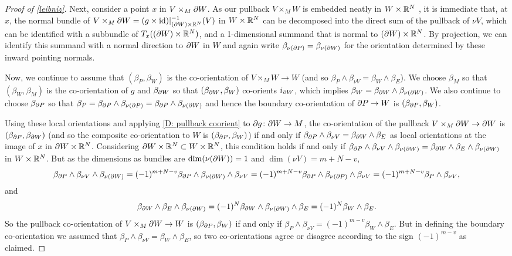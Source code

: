 \begin{proof}[Proof of \cref{leibniz}]
	Next, consider a point $x$ in $V \times_M \partial W$.
	As our pullback $V \times_M W$ is embedded neatly in $W \times \mathbb{R}^N$ \cite[Proposition IV.1.4]{Kos93}, it is immediate that, at $x$, the normal bundle of $V \times_M \partial W = (g \times \mathrm{id})|_{(\partial W) \times \mathbb{R}^N}^{-1}(V)$ in $W \times \mathbb{R}^N$ can be decomposed into the direct sum of the pullback of $\nu V$, which can be identified with a subbundle of $T_x((\partial W) \times \mathbb{R}^N)$, and a 1-dimensional summand that is normal to $(\partial W) \times \mathbb{R}^N$. By projection, we can identify this summand with a normal direction to $\partial W$ in $W$ and again write $\beta_{\nu(\partial P)}=\beta_{\nu(\partial W)}$ for the orientation determined by these inward pointing normals.


	Now, we continue to assume that $(\beta_P, \beta_W)$ is the co-orientation of $V \times_M W \to W$ (and so $\beta_P \wedge \beta_{\nu V} = \beta_W \wedge \beta_E$).
	We choose $\beta_M$ so that $(\beta_W,\beta_M)$ is the co-orientation of $g$ and $\beta_{\partial W}$ so that $(\beta_{\partial W},\beta_W)$ co-orients $i_{\partial W}$, which implies $\beta_W = \beta_{\partial W} \wedge \beta_{\nu(\partial W)}$.
	We also continue to choose $\beta_{\partial P}$ so that $\beta_P = \beta_{\partial P} \wedge \beta_{\nu(\partial P)} = \beta_{\partial P} \wedge \beta_{\nu(\partial W)}$ and hence the boundary co-orientation of $\partial P \to W$ is $(\beta_{\partial P}, \beta_W)$.

	Using these local orientations and applying \cref{D: pullback coorient} to $\partial g \colon \partial W \to M$, the co-orientation of the pullback $V \times_M \partial W \to \partial W$ is $(\beta_{\partial P},\beta_{\partial W})$ (and so the composite co-orientation to $W$ is $(\beta_{\partial P}, \beta_W)$) if and only if $\beta_{\partial P} \wedge \beta_{\nu V} = \beta_{\partial W} \wedge \beta_E$ as local orientations at the image of $x$ in $\partial W \times \mathbb{R}^N$.
	Considering $\partial W \times \mathbb{R}^N \subset W \times \mathbb{R}^N$, this condition holds if and only if $\beta_{\partial P} \wedge \beta_{\nu V} \wedge \beta_{\nu(\partial W)} = \beta_{\partial W} \wedge \beta_E \wedge \beta_{\nu(\partial W)}$ in $W \times \mathbb{R}^N$.
	But as the dimensions as bundles are $\dim(\nu(\partial W)) = 1$ and $\dim(\nu V) = m+N-v$,
	$$\beta_{\partial P} \wedge \beta_{\nu V} \wedge \beta_{\nu(\partial W)} = (-1)^{m+N-v}\beta_{\partial P} \wedge \beta_{\nu(\partial W)} \wedge \beta_{\nu V} = (-1)^{m+N-v}\beta_{\partial P} \wedge \beta_{\nu(\partial P)} \wedge \beta_{\nu V} = (-1)^{m+N-v}\beta_P \wedge \beta_{\nu V} ,$$
	and
	$$\beta_{\partial W} \wedge \beta_E \wedge \beta_{\nu(\partial W)} = (-1)^N\beta_{\partial W} \wedge \beta_{\nu(\partial W)} \wedge \beta_E = (-1)^N\beta_{W} \wedge \beta_E.$$
	So the pullback co-orientation of $V \times_M \partial W \to W$ is $(\beta_{\partial P},\beta_W)$ if and only if $\beta_P \wedge \beta_{\nu V} = (-1)^{m-v}\beta_{W} \wedge \beta_E$.
	But in defining the boundary co-orientation we assumed that $\beta_P \wedge \beta_{\nu V} = \beta_{W} \wedge \beta_E$, so two co-orientations agree or disagree according to the sign $(-1)^{m-v}$ as claimed.
\end{proof}


